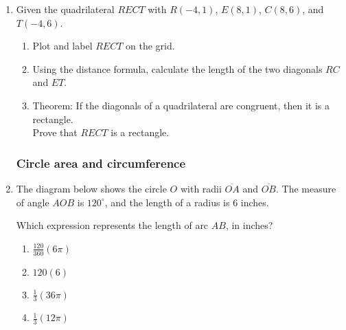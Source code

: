 \documentclass[12pt, twoside]{article}
\begin{document}
\begin{enumerate}
    \item Given the quadrilateral $RECT$ with $R(-4,1)$, $E(8,1)$, $C(8,6)$, and $T(-4,6)$.
      \begin{enumerate}
        \item Plot and label $RECT$ on the grid.
        \item Using the distance formula, calculate the length of the two diagonals $RC$ and $ET$.
        \item Theorem: If the diagonals of a quadrilateral are congruent, then it is a rectangle.\\[0.5cm]
        Prove that $RECT$ is a rectangle.
      \end{enumerate}
      \begin{center} %
      \end{center}

    \subsubsection*{Circle area and circumference}
      \item The diagram below shows the circle $O$ with radii $\overline{OA}$ and $\overline{OB}$. The measure of angle $AOB$ is $120^\circ$, and the length of a radius is 6 inches.
      \begin{center}
      \end{center}
      Which expression represents the length of arc $AB$, in inches?
      \begin{multicols}{2}
        \begin{enumerate}
          \item $\displaystyle \frac{120}{360}(6\pi)$
          \item $120(6)$
          \item $\displaystyle \frac{1}{3}(36\pi)$
          \item $\displaystyle \frac{1}{3}(12\pi)$
        \end{enumerate}
    \end{multicols}

  \end{enumerate}
\end{document}
